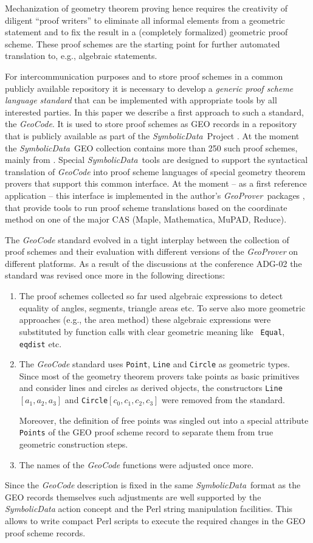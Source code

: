 \documentclass[11pt]{article}
\newcommand{\GC}{\textit{Geo\-Code}}
\newcommand{\GP}{\textit{Geo\-Prover}}
\newcommand{\SD}{\textit{Symbolic\-Data}}
\begin{document}
Mechanization of geometry theorem proving hence requires the creativity of
diligent ``proof writers'' to eliminate all informal elements from a geometric
statement and to fix the result in a (completely formalized) geometric proof
scheme.  These proof schemes are the starting point for further automated
translation to, e.g., algebraic statements.

For intercommunication purposes and to store proof schemes in a common
publicly available repository it is necessary to develop a {\em generic proof
  scheme language standard} that can be implemented with appropriate tools by
all interested parties.  In this paper we describe a first approach to such a
standard, the {\em {\GC}}. It is used to store proof schemes as GEO records in
a repository that is publicly available as part of the \SD\ Project
\cite{SymbolicData}.  At the moment the \SD\ GEO collection contains more than
250 such proof schemes, mainly from \cite{Books/Chou_88a}.  Special \SD\ tools
are designed to support the syntactical translation of {\GC} into proof scheme
languages of special geometry theorem provers that support this common
interface.  At the moment -- as a first reference application -- this
interface is implemented in the author's \GP\ packages \cite{GeoProver}, that
provide tools to run proof scheme translations based on the coordinate
method on one of the major CAS (Maple, Mathematica, MuPAD, Reduce).

The {\GC} standard evolved in a tight interplay between the collection of
proof schemes and their evaluation with different versions of the {\GP} on
different platforms. As a result of the discussions at the conference ADG-02
the standard was revised once more in the following directions:
\begin{enumerate}
\item The proof schemes collected so far used algebraic expressions to detect
  equality of angles, segments, triangle areas etc. To serve also more
  geometric approaches (e.g., the area method) these algebraic expressions
  were substituted by function calls with clear geometric meaning like {\tt
    Equal}, {\tt eqdist} etc. 
\item The {\GC} standard uses {\tt Point}, {\tt Line} and {\tt Circle} as
  geometric types.  Since most of the geometry theorem provers take points as
  basic primitives and consider lines and circles as derived objects, the
  constructors {\tt Line}$[a_1,a_2,a_3]$ and {\tt Circle}$[c_0,c_1,c_2,c_3]$
  were removed from the standard.
  
  Moreover, the definition of free points was singled out into a special
  attribute {\tt Points} of the GEO proof scheme record to separate them from
  true geometric construction steps.
\item The names of the {\GC} functions were adjusted once more. 
\end{enumerate}
Since the {\GC} description is fixed in the same \SD\ format as the GEO
records themselves such adjustments are well supported by the {\SD} action
concept and the Perl string manipulation facilities. This allows to write
compact Perl scripts to execute the required changes in the GEO proof scheme
records.  
\medskip
\end{document}
